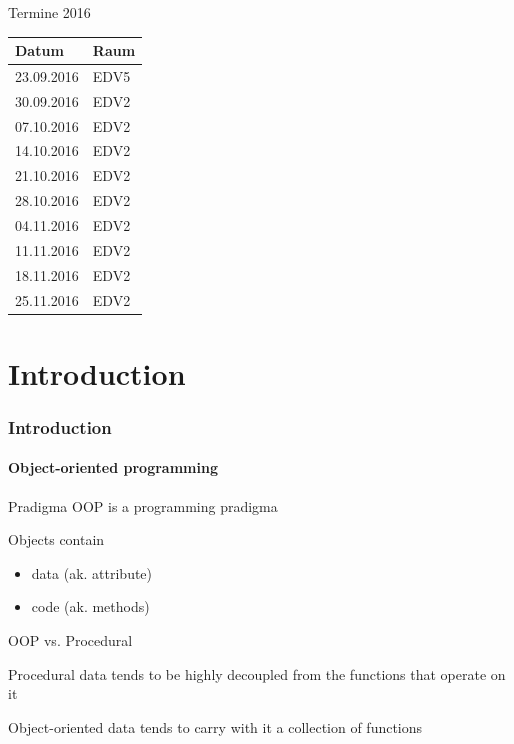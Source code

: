\documentclass{beamer}
\begin{document}
\begin{frame}{Termine 2016}
\begin{table}
\begin{tabular}{l | l }
Datum & Raum \\
\hline
23.09.2016 & EDV5 \\
30.09.2016 & EDV2 \\
07.10.2016 & EDV2 \\
14.10.2016 & EDV2 \\
21.10.2016 & EDV2 \\
28.10.2016 & EDV2 \\
04.11.2016 & EDV2 \\
11.11.2016 & EDV2 \\
18.11.2016 & EDV2 \\
25.11.2016 & EDV2
\end{tabular}
\end{table}
\end{frame}

\part{Introduction}

\section{Introduction}

\subsection{Object-oriented programming}

\begin{frame}{Pradigma}
OOP is a programming pradigma

Objects contain
\begin{itemize}
\item data (ak. attribute)
\item code (ak. methods)
\end{itemize}

\end{frame}

\begin{frame}{OOP vs. Procedural}

\begin{block}{Procedural}
data tends to be highly decoupled from the functions that operate on it
\end{block}

\begin{block}{Object-oriented}
data tends to carry with it a collection of functions
\end{block}


\end{frame}
\end{document}
